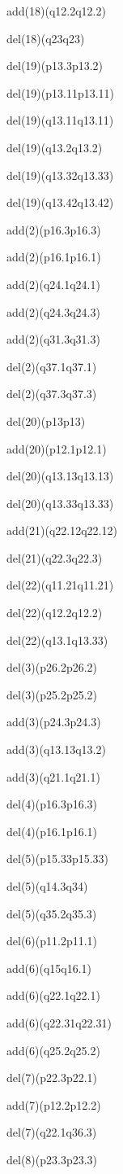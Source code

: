 \documentclass[]{article}
\begin{document}
add(18)(q12.2q12.2)

del(18)(q23q23)

del(19)(p13.3p13.2)

del(19)(p13.11p13.11)

del(19)(q13.11q13.11)

del(19)(q13.2q13.2)

del(19)(q13.32q13.33)

del(19)(q13.42q13.42)

add(2)(p16.3p16.3)

add(2)(p16.1p16.1)

add(2)(q24.1q24.1)

add(2)(q24.3q24.3)

add(2)(q31.3q31.3)

del(2)(q37.1q37.1)

del(2)(q37.3q37.3)

del(20)(p13p13)

add(20)(p12.1p12.1)

del(20)(q13.13q13.13)

del(20)(q13.33q13.33)

add(21)(q22.12q22.12)

del(21)(q22.3q22.3)

del(22)(q11.21q11.21)

del(22)(q12.2q12.2)

del(22)(q13.1q13.33)

del(3)(p26.2p26.2)

del(3)(p25.2p25.2)

add(3)(p24.3p24.3)

add(3)(q13.13q13.2)

add(3)(q21.1q21.1)

del(4)(p16.3p16.3)

del(4)(p16.1p16.1)

del(5)(p15.33p15.33)

del(5)(q14.3q34)

del(5)(q35.2q35.3)

del(6)(p11.2p11.1)

add(6)(q15q16.1)

add(6)(q22.1q22.1)

add(6)(q22.31q22.31)

add(6)(q25.2q25.2)

del(7)(p22.3p22.1)

add(7)(p12.2p12.2)

del(7)(q22.1q36.3)

del(8)(p23.3p23.3)
\end{document}
